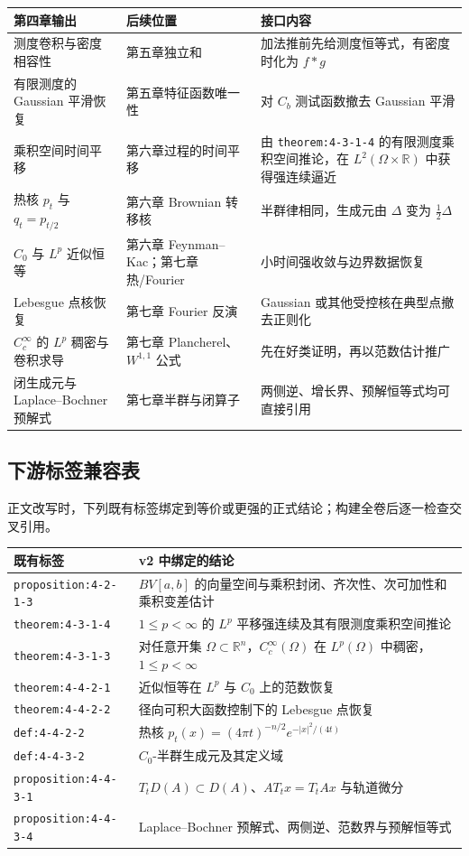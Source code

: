 \documentclass[11pt,a4paper]{ctexart}
\newcommand{\R}{\mathbb R}
\begin{document}
\begin{longtable}{p{}p{}p{}}
\toprule
第四章输出 & 后续位置 & 接口内容\\
\midrule
测度卷积与密度相容性 & 第五章独立和 & 加法推前先给测度恒等式，有密度时化为 $f*g$\\
有限测度的 Gaussian 平滑恢复 & 第五章特征函数唯一性 & 对 $C_b$ 测试函数撤去 Gaussian 平滑\\
乘积空间时间平移 & 第六章过程的时间平移 & 由 \texttt{theorem:4-3-1-4} 的有限测度乘积空间推论，在 $L^2(\Omega\times\R)$ 中获得强连续逼近\\
热核 $p_t$ 与 $q_t=p_{t/2}$ & 第六章 Brownian 转移核 & 半群律相同，生成元由 $\Delta$ 变为 $\tfrac12\Delta$\\
$C_0$ 与 $L^p$ 近似恒等 & 第六章 Feynman--Kac；第七章热/Fourier & 小时间强收敛与边界数据恢复\\
Lebesgue 点核恢复 & 第七章 Fourier 反演 & Gaussian 或其他受控核在典型点撤去正则化\\
$C_c^\infty$ 的 $L^p$ 稠密与卷积求导 & 第七章 Plancherel、$W^{1,1}$ 公式 & 先在好类证明，再以范数估计推广\\
闭生成元与 Laplace--Bochner 预解式 & 第七章半群与闭算子 & 两侧逆、增长界、预解恒等式均可直接引用\\
\bottomrule
\end{longtable}

\subsection{下游标签兼容表}

正文改写时，下列既有标签绑定到等价或更强的正式结论；构建全卷后逐一检查交叉引用。

\begin{longtable}{p{}p{}}
\toprule
既有标签 & v2 中绑定的结论\\
\midrule
\texttt{proposition:4-2-1-3} & $BV[a,b]$ 的向量空间与乘积封闭、齐次性、次可加性和乘积变差估计\\
\texttt{theorem:4-3-1-4} & $1\le p<\infty$ 的 $L^p$ 平移强连续及其有限测度乘积空间推论\\
\texttt{theorem:4-3-1-3} & 对任意开集 $\Omega\subset\R^n$，$C_c^\infty(\Omega)$ 在 $L^p(\Omega)$ 中稠密，$1\le p<\infty$\\
\texttt{theorem:4-4-2-1} & 近似恒等在 $L^p$ 与 $C_0$ 上的范数恢复\\
\texttt{theorem:4-4-2-2} & 径向可积大函数控制下的 Lebesgue 点恢复\\
\texttt{def:4-4-2-2} & 热核 $p_t(x)=(4\pi t)^{-n/2}e^{-|x|^2/(4t)}$\\
\texttt{def:4-4-3-2} & $C_0$-半群生成元及其定义域\\
\texttt{proposition:4-4-3-1} & $T_tD(A)\subset D(A)$、$AT_tx=T_tAx$ 与轨道微分\\
\texttt{proposition:4-4-3-4} & Laplace--Bochner 预解式、两侧逆、范数界与预解恒等式\\
\bottomrule
\end{longtable}
\end{document}
